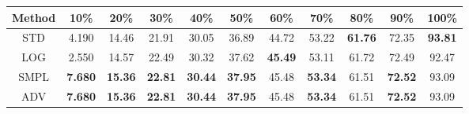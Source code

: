 \documentclass{standalone}
\begin{document}
\begin{tabular}{c|cccccccccc}
      \toprule
      Method & 10\% & 20\% & 30\% & 40\% & 50\% & 60\% & 70\% & 80\% & 90\% & 100\% \\
      \midrule
STD & 4.190 & 14.46 & 21.91 & 30.05 & 36.89 & 44.72 & 53.22 & \textbf{61.76} & 72.35 & \textbf{93.81}\\
LOG & 2.550 & 14.57 & 22.49 & 30.32 & 37.62 & \textbf{45.49} & 53.11 & 61.72 & 72.49 & 92.47\\
SMPL & \textbf{7.680} & \textbf{15.36} & \textbf{22.81} & \textbf{30.44} & \textbf{37.95} & 45.48 & \textbf{53.34} & 61.51 & \textbf{72.52} & 93.09\\
ADV & \textbf{7.680} & \textbf{15.36} & \textbf{22.81} & \textbf{30.44} & \textbf{37.95} & 45.48 & \textbf{53.34} & 61.51 & \textbf{72.52} & 93.09\\
  \bottomrule
\end{tabular}
\end{document}
